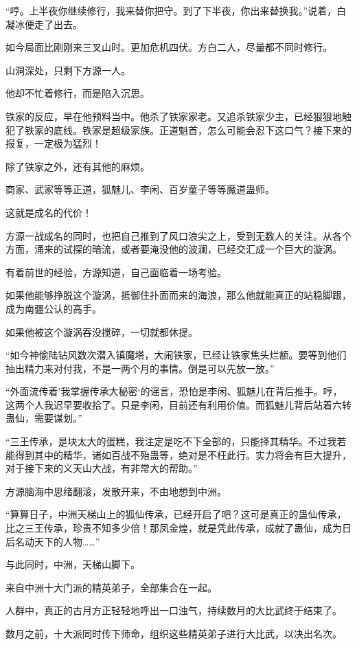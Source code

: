 \begin{this_body}
“哼。上半夜你继续修行，我来替你把守。到了下半夜，你出来替换我。”说着，白凝冰便走了出去。

如今局面比刚刚来三叉山时。更加危机四伏。方白二人，尽量都不同时修行。

山洞深处，只剩下方源一人。

他却不忙着修行，而是陷入沉思。

铁家的反应，早在他预料当中。他杀了铁家家老。又追杀铁家少主，已经狠狠地触犯了铁家的底线。铁家是超级家族。正道魁首，怎么可能会忍下这口气？接下来的报复，一定极为猛烈！

除了铁家之外，还有其他的麻烦。

商家、武家等等正道，狐魅儿、李闲、百岁童子等等魔道蛊师。

这就是成名的代价！

方源一战成名的同时，也把自己推到了风口浪尖之上，受到无数人的关注。从各个方面，涌来的试探的暗流，或者要淹没他的波澜，已经交汇成一个巨大的漩涡。

有着前世的经验，方源知道，自己面临着一场考验。

如果他能够挣脱这个漩涡，抵御住扑面而来的海浪，那么他就能真正的站稳脚跟，成为南疆公认的高手。

如果他被这个漩涡吞没搅碎，一切就都休提。

“如今神偷陆钻风数次潜入镇魔塔，大闹铁家，已经让铁家焦头烂额。要等到他们抽出精力来对付我，不是一两个月的事情。倒是可以先放一放。”

“外面流传着’我掌握传承大秘密‘的谣言，恐怕是李闲、狐魅儿在背后推手。哼，这两个人我迟早要收拾了。只是李闲，目前还有利用价值。而狐魅儿背后站着六转蛊仙，需要谋划。”

“三王传承，是块太大的蛋糕，我注定是吃不下全部的，只能择其精华。不过我若能得到其中的精华，诸如百战不殆蛊等，绝对是不枉此行。实力将会有巨大提升，对于接下来的义天山大战，有非常大的帮助。”

方源脑海中思绪翻滚，发散开来，不由地想到中洲。

“算算日子，中洲天梯山上的狐仙传承，已经开启了吧？这可是真正的蛊仙传承，比之三王传承，珍贵不知多少倍！那凤金煌，就是凭此传承，成就了蛊仙，成为日后名动天下的人物……”

与此同时，中洲，天梯山脚下。

来自中洲十大门派的精英弟子，全部集合在一起。

人群中，真正的古月方正轻轻地呼出一口浊气，持续数月的大比武终于结束了。

数月之前，十大派同时传下师命，组织这些精英弟子进行大比武，以决出名次。


\end{this_body}

